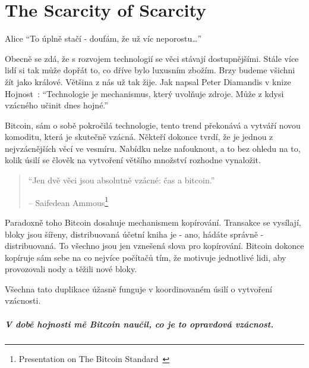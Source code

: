 
\chapter{The Scarcity of Scarcity}
\label{les:2}

\begin{chapquote}{Alice}
\enquote{To úplně stačí - doufám, že už víc neporostu\ldots}
\end{chapquote}

Obecně se zdá, že s rozvojem technologií se věci stávají dostupnějšími. 
Stále více lidí si tak může dopřát to, co dříve bylo luxusním zbožím. 
Brzy budeme všichni žít jako králové. Většina z nás už tak žije. Jak 
napsal Peter Diamandis v knize Hojnost~\cite{abundance}: \enquote{Technologie 
je mechanismus, který uvolňuje zdroje. Může z kdysi vzácného učinit dnes hojné.}

Bitcoin, sám o sobě pokročilá technologie, tento trend překonává a vytváří 
novou komoditu, která je skutečně vzácná. Někteří dokonce tvrdí, že je 
jednou z nejvzácnějších věcí ve vesmíru. Nabídku nelze nafouknout, a to 
bez ohledu na to, kolik úsilí se člověk na vytvoření většího množství 
rozhodne vynaložit.

\begin{quotation}\begin{samepage}
\enquote{Jen dvě věci jsou absolutně vzácné: čas a bitcoin.}
\begin{flushright} -- Saifedean Ammous\footnote{Presentation on The Bitcoin Standard~\cite{bitcoinstandard-pres}}
\end{flushright}\end{samepage}\end{quotation}

Paradoxně toho Bitcoin dosahuje mechanismem kopírování. Transakce se vysílají, 
bloky jsou šířeny, distribuovaná účetní kniha je - ano, hádáte správně - distribuovaná. 
To všechno jsou jen vznešená slova pro kopírování. Bitcoin dokonce kopíruje 
sám sebe na co nejvíce počítačů tím, že motivuje jednotlivé lidi, aby 
provozovali nody a těžili nové bloky.

Všechna tato duplikace úžasně funguje v koordinovaném úsilí o vytvoření vzácnosti.

\paragraph{V době hojnosti mě Bitcoin naučil, co je to opravdová vzácnost.}


